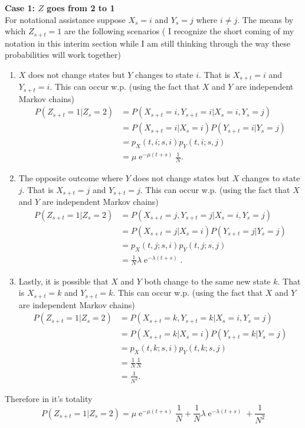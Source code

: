 \documentclass[10pt]{amsart}
\DeclareMathOperator{\E}{e}
\begin{document}
\noindent
\textbf{Case 1: $Z$ goes from 2 to 1} \\
For notational assistance suppose $X_s = i$ and $Y_s = j$ where $i \neq j$.
The means by which $Z_{s + t} = 1$ are the following scenarios ( I recognize the short coming of my notation in this interim section while I am still thinking through the way these probabilities will work together)
\begin{enumerate}
\item $X$ does not change states but $Y$ changes to state $i$.
That is $X_{s + t} = i$ and $Y_{s + t} = i$.
This can occur w.p. (using the fact that $X$ and $Y$ are independent Markov chains)
\begin{align*}
P(Z_{s + t} = 1 | Z_s = 2)
	&= P(X_{s + t} = i,Y_{s + t} = i | X_s = i,Y_s = j) \\
	&= P(X_{s + t} = i| X_s = i)P(Y_{s + t} = i | Y_s = j) \\
	&= p_X(t,i;s,i) p_Y(t,i;s,j) \\
	&= \mu\E^{-\mu(t + s)} \frac 1 N.
\end{align*}
\item The opposite outcome where $Y$ does not change states but $X$ changes to state $j$.
That is $X_{s + t} = j$ and $Y_{s + t} = j$.
This can occur w.p. (using the fact that $X$ and $Y$ are independent Markov chains)
\begin{align*}
P(Z_{s + t} = 1 | Z_s = 2)
	&= P(X_{s + t} = j,Y_{s + t} = j | X_s = i,Y_s = j) \\
	&= P(X_{s + t} = j| X_s = i)P(Y_{s + t} = j | Y_s = j) \\
	&= p_X(t,j;s,i)p_Y(t,j;s,j) \\
	&= \frac 1 N \lambda\E^{-\lambda(t + s)}.
\end{align*}
\item Lastly, it is possible that $X$ and $Y$ both change to the same new state $k$.
That is $X_{s + t} = k$ and $Y_{s + t} = k$.
This can occur w.p. (using the fact that $X$ and $Y$ are independent Markov chains)
\begin{align*}
P(Z_{s + t} = 1 | Z_s = 2)
	&= P(X_{s + t} = k,Y_{s + t} = k | X_s = i,Y_s = j) \\
	&= P(X_{s + t} = k| X_s = i)P(Y_{s + t} = k | Y_s = j) \\
	&= p_X(t,k;s,i)p_Y(t,k;s,j) \\
	&= \frac 1 N \frac 1 N \\
	&= \frac 1 {N^2}.
\end{align*}
\end{enumerate}
Therefore in it's totality 
$$
P(Z_{s + t} = 1 | Z_s = 2) = \mu\E^{-\mu(t + s)} \frac 1 N + \frac 1 N \lambda\E^{-\lambda(t + s)} + \frac 1 {N^2}
$$
\end{document}
